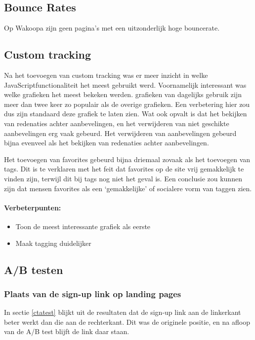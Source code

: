 \documentclass[a4paper, 10pt, pdftex]{report}
\begin{document}
    \subsection{Bounce Rates}
      Op Wakoopa zijn geen pagina's met een uitzonderlijk hoge bouncerate.

    \subsection{Custom tracking}
    Na het toevoegen van custom tracking was er meer inzicht in welke JavaScriptfunctionaliteit het meest gebruikt werd. Voornamelijk interessant was welke grafieken het meest bekeken werden. grafieken van dagelijks gebruik zijn meer dan twee keer zo populair als de overige grafieken. Een verbetering hier zou dus zijn standaard deze grafiek te laten zien. Wat ook opvalt is dat het bekijken van redenaties achter aanbevelingen, en het verwijderen van niet geschikte aanbevelingen erg vaak gebeurd. Het verwijderen van aanbevelingen gebeurd bijna evenveel als het bekijken van redenaties achter aanbevelingen.

    Het toevoegen van favorites gebeurd bijna driemaal zovaak als het toevoegen van tags. Dit is te verklaren met het feit dat favorites op de site vrij gemakkelijk te vinden zijn, terwijl dit bij tags nog niet het geval is. Een conclusie zou kunnen zijn dat mensen favorites als een `gemakkelijke' of socialere vorm van taggen zien.

    \paragraph{\textbf{Verbeterpunten:}}
      \begin{itemize}
        \item Toon de meest interessante grafiek als eerste
        \item Maak tagging duidelijker
      \end{itemize}

    \subsection{A/B testen}
      \subsubsection{Plaats van de sign-up link op landing pages}
        In sectie \ref{ctatest} blijkt uit de resultaten dat de sign-up link aan de linkerkant beter werkt dan die aan de rechterkant. Dit was de originele positie, en na afloop van de A/B test blijft de link daar staan.
\end{document}
